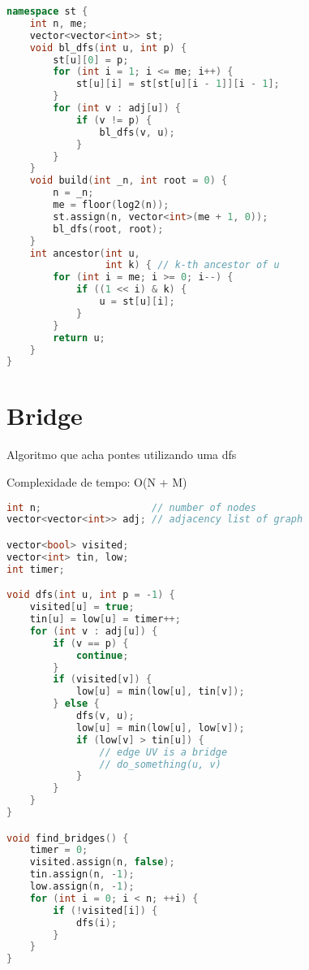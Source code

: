 \documentclass[11pt, a4paper, oneside]{book}
\begin{document}
\begin{multicols}{2}
\begin{lstlisting}[language=C++]
namespace st {
    int n, me;
    vector<vector<int>> st;
    void bl_dfs(int u, int p) {
        st[u][0] = p;
        for (int i = 1; i <= me; i++) {
            st[u][i] = st[st[u][i - 1]][i - 1];
        }
        for (int v : adj[u]) {
            if (v != p) {
                bl_dfs(v, u);
            }
        }
    }
    void build(int _n, int root = 0) {
        n = _n;
        me = floor(log2(n));
        st.assign(n, vector<int>(me + 1, 0));
        bl_dfs(root, root);
    }
    int ancestor(int u,
                 int k) { // k-th ancestor of u
        for (int i = me; i >= 0; i--) {
            if ((1 << i) & k) {
                u = st[u][i];
            }
        }
        return u;
    }
}
\end{lstlisting}
\end{multicols}

\hfill

\section{Bridge}


Algoritmo que acha pontes utilizando uma dfs



Complexidade de tempo: O(N + M)
\hfill

\begin{multicols}{2}
\begin{lstlisting}[language=C++]
int n;                   // number of nodes
vector<vector<int>> adj; // adjacency list of graph

vector<bool> visited;
vector<int> tin, low;
int timer;

void dfs(int u, int p = -1) {
    visited[u] = true;
    tin[u] = low[u] = timer++;
    for (int v : adj[u]) {
        if (v == p) {
            continue;
        }
        if (visited[v]) {
            low[u] = min(low[u], tin[v]);
        } else {
            dfs(v, u);
            low[u] = min(low[u], low[v]);
            if (low[v] > tin[u]) {
                // edge UV is a bridge
                // do_something(u, v)
            }
        }
    }
}

void find_bridges() {
    timer = 0;
    visited.assign(n, false);
    tin.assign(n, -1);
    low.assign(n, -1);
    for (int i = 0; i < n; ++i) {
        if (!visited[i]) {
            dfs(i);
        }
    }
}
\end{lstlisting}
\end{multicols}
\end{document}
